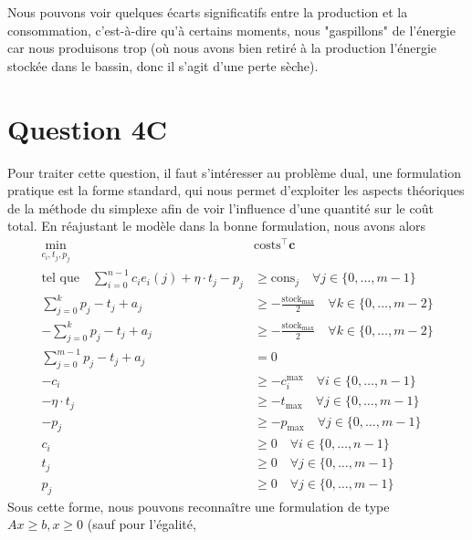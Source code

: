 \documentclass{article}
\begin{document}
\noindent Nous pouvons voir quelques écarts significatifs entre la production et la consommation, c'est-à-dire 
qu'à certains moments, nous "gaspillons" de l'énergie car nous produisons trop (où nous avons bien retiré à la production l'énergie stockée dans le bassin, donc il s'agit d'une perte sèche).


\clearpage
\section*{Question 4C}
Pour traiter cette question, il faut s'intéresser au problème dual, une formulation pratique est la forme standard, qui nous 
permet d'exploiter les aspects théoriques de la méthode du simplexe afin de voir l'influence d'une quantité sur le coût total.
En réajustant le modèle dans la bonne formulation, nous avons alors 
\begin{align}
    \min_{c_{i},t_j,p_j} \quad &\mathrm{costs}^\intercal\mathbf{c} \nonumber\\
    \textrm{tel que} \quad  \sum_{i=0}^{n-1} c_i e_i(j) + \eta \cdot t_j - p_j &\ge \mathrm{cons}_j \quad \forall j \in  \{ 0, \ldots, m-1 \}\label{eq:4C_contr1}\\
     \sum_{j=0}^{k} p_j - t_j + a_j &\ge  -\frac{\mathrm{stock}_\mathrm{max}}{2} \quad \forall k \in \{ 0, \ldots, m-2 \}\label{eq:4C_contr20}\\
    -\sum_{j=0}^{k} p_j - t_j + a_j &\ge  -\frac{\mathrm{stock}_\mathrm{max}}{2} \quad \forall k \in \{ 0, \ldots, m-2 \}\label{eq:4C_contr21}\\
     \sum_{j=0}^{m-1} p_j - t_j + a_j &= 0 \label{eq:4C_contr3}\\
     -c_i &\ge -c_i^\mathrm{max}  \quad \forall i \in  \{ 0, \ldots, n-1 \}  \label{eq:4C_contr40}\\
    - \eta \cdot t_j &\ge  -t_\mathrm{max} \quad \forall j \in  \{ 0, \ldots, m-1 \}  \label{eq:4C_contr50}\\
     -p_j &\ge  -p_\mathrm{max} \quad \forall j \in  \{ 0, \ldots, m-1 \} \label{eq:4C_contr60}\\
     c_i &\ge 0  \quad \forall i \in  \{ 0, \ldots, n-1 \}   \label{eq:4C_contr41}\\
     t_j &\ge  0 \quad \forall j \in  \{ 0, \ldots, m-1 \}  \label{eq:4C_contr51}\\
     p_j &\ge  0 \quad \forall j \in  \{ 0, \ldots, m-1 \} \label{eq:4C_contr61}
\end{align}
Sous cette forme, nous pouvons reconnaître une formulation de type $Ax \geq b, x \geq 0$ (sauf pour l'égalité, 
\end{document}

